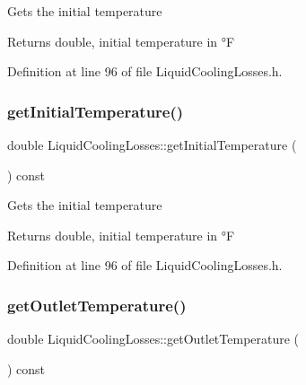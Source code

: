 Gets the initial temperature

\begin{DoxyReturn}{Returns}
double, initial temperature in °F 
\end{DoxyReturn}


Definition at line 96 of file Liquid\+Cooling\+Losses.\+h.

\mbox{\label{class_liquid_cooling_losses_a4cfb23800b80e99858bbc5c3ef5169eb}} 
\subsubsection{\texorpdfstring{get\+Initial\+Temperature()}{getInitialTemperature()}\hspace{0.1cm}{\footnotesize\ttfamily [3/3]}}
{\footnotesize\ttfamily double Liquid\+Cooling\+Losses\+::get\+Initial\+Temperature (\begin{DoxyParamCaption}{ }\end{DoxyParamCaption}) const\hspace{0.3cm}{\ttfamily [inline]}}

Gets the initial temperature

\begin{DoxyReturn}{Returns}
double, initial temperature in °F 
\end{DoxyReturn}


Definition at line 96 of file Liquid\+Cooling\+Losses.\+h.

\mbox{\label{class_liquid_cooling_losses_ae6364da9b374e95dd657096350464acb}} 
\subsubsection{\texorpdfstring{get\+Outlet\+Temperature()}{getOutletTemperature()}\hspace{0.1cm}{\footnotesize\ttfamily [1/3]}}
{\footnotesize\ttfamily double Liquid\+Cooling\+Losses\+::get\+Outlet\+Temperature (\begin{DoxyParamCaption}{ }\end{DoxyParamCaption}) const\hspace{0.3cm}{\ttfamily [inline]}}

